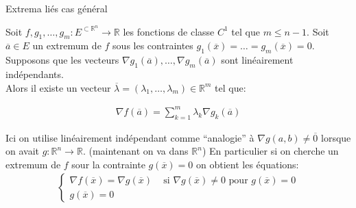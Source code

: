 \begin{parag}{Extrema liés cas général}
    \begin{theoreme}
        Soit $f, g_1, \ldots, g_m : E^{ \subset \mathbb{R}^{n}} \to \mathbb{R}$ les fonctions de classe $C^1$ tel que $m \leq n - 1$. Soit $\overline{a} \in E $ un extremum de $f$ sous les contraintes $g_1\left(\overline{x}\right) = \ldots = g_m\left(\overline{x}\right) = 0$.\\
        Supposons que les vecteurs $\nabla g_1\left(\overline{a}\right), \ldots, \nabla g_m\left(\overline{a}\right)$ sont linéairement indépendants.\\
        Alors il existe un vecteur $\overline{\lambda} = \left(\lambda_1, \ldots, \lambda_m\right) \in \mathbb{R}^{m}$ tel que:
        \begin{formule}
            \begin{align*} \nabla f\left(\overline{a}\right) = \sum_{k = 1}^{m} \lambda_k \nabla g_k\left(\overline{a}\right) \end{align*}
        \end{formule}
        
    \end{theoreme}
    Ici on utilise linéairement indépendant comme ``analogie'' à $\nabla g\left(a, b\right) \neq \overline{0}$ lorsque on avait $g: \mathbb{R}^{n} \to \mathbb{R}$. (maintenant on va dans $\mathbb{R}^{n}$)
    En particulier si on cherche un extremum de $f$ sour la contrainte $g\left(\overline{x}\right) = 0$ on obtient les équations:
    \begin{align*} 
        \begin{cases}
            \nabla f\left(\overline{x}\right) =  \nabla g\left(\overline{x}\right)\; \; \; \text{ si } \nabla g\left(\overline{x}\right) \neq 0 \text{ pour } g\left(\overline{x}\right) = 0\\
            g\left(\overline{x}\right) = 0
        \end{cases}
    \end{align*}
\end{parag}
